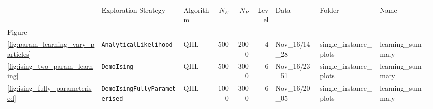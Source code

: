 \begin{tabular}{lllrrrlll}
\hline
{} &                     Exploration Strategy &                                Algorithm &                                    $N_E$ &                                    $N_P$ &                                    Level &                                     Data &                                   Folder &                                     Name \\
Figure                                   &                                          &                                          &                                          &                                          &                                          &                                          &                                          &                                          \\
\midrule
\cref{fig:param_learning_vary_particles} &            \texttt{AnalyticalLikelihood} &                                      QHL &                                      500 &                                     2000 &                                        4 &                           Nov\_16/14\_28 &                  single\_instance\_plots &                        learning\_summary \\
\cref{fig:ising_two_param_learning}      &                       \texttt{DemoIsing} &                                      QHL &                                      500 &                                     3000 &                                        6 &                           Nov\_16/23\_51 &                  single\_instance\_plots &                        learning\_summary \\
\cref{fig:ising_fully_parameterised}     &     \texttt{DemoIsingFullyParameterised} &                                      QHL &                                     1000 &                                     3000 &                                        6 &                           Nov\_16/20\_05 &                  single\_instance\_plots &                        learning\_summary \\
\hline
\end{tabular}
